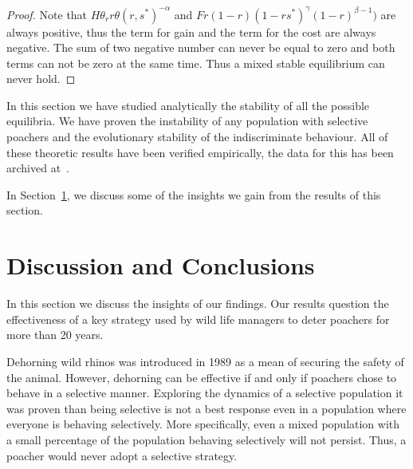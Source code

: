 \documentclass[10pt]{article}
\begin{document}
\begin{proof}
    Note that \(H \theta_r r \theta(r, s^*)^{-\alpha}\) and \( F  r{(1 - r)} 
    (1 - rs^*)^{\gamma}(1 - r)^{\beta - 1})\) are always positive, thus the
    term for gain and the term for the cost are always negative. The sum
    of two negative number can never be equal to zero and both terms
    can not be zero at the same time. Thus a mixed stable equilibrium can
    never hold.
\end{proof}


In this section we have studied analytically the stability of all the possible
equilibria. We have proven the instability of any population with selective
poachers
and the evolutionary stability of the indiscriminate behaviour. 
All of these theoretic results have been verified empirically, the data for this
has been archived at~\cite{}.

In Section~\ref{section:discussion}, we discuss some of the insights we
gain from the results of this section.

\section{Discussion and Conclusions}
\label{section:discussion}

In this section we discuss the insights of our findings. Our results question
the effectiveness of a key strategy used by wild life managers to deter poachers
for more than 20 years. 

Dehorning wild rhinos was introduced in 1989 as a mean of securing the
safety of the animal. However, dehorning can be effective if and only if
poachers chose to behave in a selective manner. Exploring the
dynamics of a selective population it was proven than being selective is not
a best response even in a population where everyone is behaving selectively.
More specifically, even a mixed population with a small percentage of the 
population behaving selectively will not persist. Thus, a poacher would never
adopt a selective strategy. 
\end{document}
